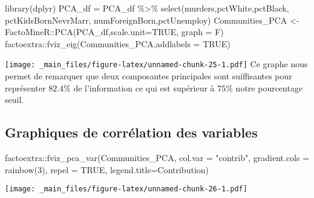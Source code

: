 \documentclass[
]{book}
\newenvironment{Shaded}{\begin{snugshade}}{\end{snugshade}}
\newcommand{\AttributeTok}[1]{\textcolor[rgb]{0.77,0.63,0.00}{#1}}
\newcommand{\ConstantTok}[1]{\textcolor[rgb]{0.00,0.00,0.00}{#1}}
\newcommand{\DecValTok}[1]{\textcolor[rgb]{0.00,0.00,0.81}{#1}}
\newcommand{\FunctionTok}[1]{\textcolor[rgb]{0.00,0.00,0.00}{#1}}
\newcommand{\NormalTok}[1]{#1}
\newcommand{\OtherTok}[1]{\textcolor[rgb]{0.56,0.35,0.01}{#1}}
\newcommand{\SpecialCharTok}[1]{\textcolor[rgb]{0.00,0.00,0.00}{#1}}
\newcommand{\StringTok}[1]{\textcolor[rgb]{0.31,0.60,0.02}{#1}}
\begin{document}
\begin{Shaded}
\begin{Highlighting}[]
\FunctionTok{library}\NormalTok{(dplyr)}
\NormalTok{PCA\_df }\OtherTok{=}\NormalTok{ PCA\_df }\SpecialCharTok{\%\textgreater{}\%} \FunctionTok{select}\NormalTok{(murders,pctWhite,pctBlack,}
\NormalTok{                           pctKidsBornNevrMarr,}
\NormalTok{                           numForeignBorn,pctUnemploy)}
\NormalTok{Communities\_PCA }\OtherTok{\textless{}{-}}\NormalTok{ FactoMineR}\SpecialCharTok{::}\FunctionTok{PCA}\NormalTok{(PCA\_df,}\AttributeTok{scale.unit=}\ConstantTok{TRUE}\NormalTok{,}
                                   \AttributeTok{graph =}\NormalTok{ F)}
\NormalTok{factoextra}\SpecialCharTok{::}\FunctionTok{fviz\_eig}\NormalTok{(Communities\_PCA,}\AttributeTok{addlabels =} \ConstantTok{TRUE}\NormalTok{)}
\end{Highlighting}
\end{Shaded}

\texttt{[image: \_main\_files/figure-latex/unnamed-chunk-25-1.pdf]}
Ce graphe nous permet de remarquer que deux composantes principales sont suiffisantes pour représenter \(82.4\%\) de l'information ce qui est supérieur à \(75\%\) notre pourcentage seuil.\\

\hypertarget{graphiques-de-corruxe9lation-des-variables}{%
\subsection*{Graphiques de corrélation des variables}\label{graphiques-de-corruxe9lation-des-variables}}

\begin{Shaded}
\begin{Highlighting}[]
\NormalTok{factoextra}\SpecialCharTok{::}\FunctionTok{fviz\_pca\_var}\NormalTok{(Communities\_PCA,}
             \AttributeTok{col.var =} \StringTok{"contrib"}\NormalTok{, }
             \AttributeTok{gradient.cols =} \FunctionTok{rainbow}\NormalTok{(}\DecValTok{3}\NormalTok{),}
             \AttributeTok{repel =} \ConstantTok{TRUE}\NormalTok{,}
             \AttributeTok{legend.title=}\StringTok{\textquotesingle{}Contribution\textquotesingle{}}\NormalTok{)}
\end{Highlighting}
\end{Shaded}

\texttt{[image: \_main\_files/figure-latex/unnamed-chunk-26-1.pdf]}
\end{document}
